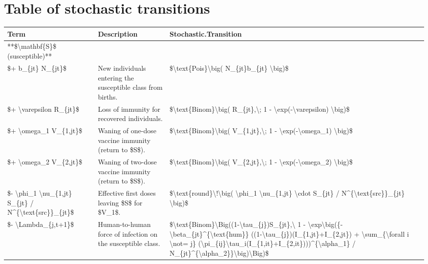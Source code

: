 \documentclass[
]{book}
\begin{document}
\label{transitions-table}

\section{Table of stochastic transitions}\label{table-of-stochastic-transitions}

\begin{tabular}{l|l|l}
\hline
Term & Description & Stochastic.Transition\\
\hline
**\$\textbackslash{}mathbf\{S\}\$ (susceptible)** &  & \\
\hline
\$+ b\_\{jt\} N\_\{jt\}\$ & New individuals entering the susceptible class from births. & \$\textbackslash{}text\{Pois\}\textbackslash{}big( N\_\{jt\}b\_\{jt\} \textbackslash{}big)\$\\
\hline
\$+ \textbackslash{}varepsilon R\_\{jt\}\$ & Loss of immunity for recovered individuals. & \$\textbackslash{}text\{Binom\}\textbackslash{}big( R\_\{jt\},\textbackslash{}; 1 - \textbackslash{}exp(-\textbackslash{}varepsilon) \textbackslash{}big)\$\\
\hline
\$+ \textbackslash{}omega\_1 V\_\{1,jt\}\$ & Waning of one-dose vaccine immunity (return to \$S\$). & \$\textbackslash{}text\{Binom\}\textbackslash{}big( V\_\{1,jt\},\textbackslash{}; 1 - \textbackslash{}exp(-\textbackslash{}omega\_1) \textbackslash{}big)\$\\
\hline
\$+ \textbackslash{}omega\_2 V\_\{2,jt\}\$ & Waning of two-dose vaccine immunity (return to \$S\$). & \$\textbackslash{}text\{Binom\}\textbackslash{}big( V\_\{2,jt\},\textbackslash{}; 1 - \textbackslash{}exp(-\textbackslash{}omega\_2) \textbackslash{}big)\$\\
\hline
\$- \textbackslash{}phi\_1 \textbackslash{}nu\_\{1,jt\} S\_\{jt\} / N\textasciicircum{}\{\textbackslash{}text\{src\}\}\_\{jt\}\$ & Effective first doses leaving \$S\$ for \$V\_1\$. & \$\textbackslash{}text\{round\}\textbackslash{}!\textbackslash{}big( \textbackslash{}phi\_1 \textbackslash{}nu\_\{1,jt\} \textbackslash{}cdot S\_\{jt\} / N\textasciicircum{}\{\textbackslash{}text\{src\}\}\_\{jt\} \textbackslash{}big)\$\\
\hline
\$- \textbackslash{}Lambda\_\{j,t+1\}\$ & Human-to-human force of infection on the susceptible class. & \$\textbackslash{}text\{Binom\}\textbackslash{}Big((1-\textbackslash{}tau\_\{j\})S\_\{jt\},\textbackslash{} 1 - \textbackslash{}exp\textbackslash{}big(\{-\textbackslash{}beta\_\{jt\}\textasciicircum{}\{\textbackslash{}text\{hum\}\} ((1-\textbackslash{}tau\_\{j\})(I\_\{1,jt\}+I\_\{2,jt\}) + \textbackslash{}sum\_\{\textbackslash{}forall i \textbackslash{}not= j\} (\textbackslash{}pi\_\{ij\}\textbackslash{}tau\_i(I\_\{1,it\}+I\_\{2,it\})))\textasciicircum{}\{\textbackslash{}alpha\_1\} / N\_\{jt\}\textasciicircum{}\{\textbackslash{}alpha\_2\}\}\textbackslash{}big)\textbackslash{}Big)\$\\

\end{tabular}
\end{document}
